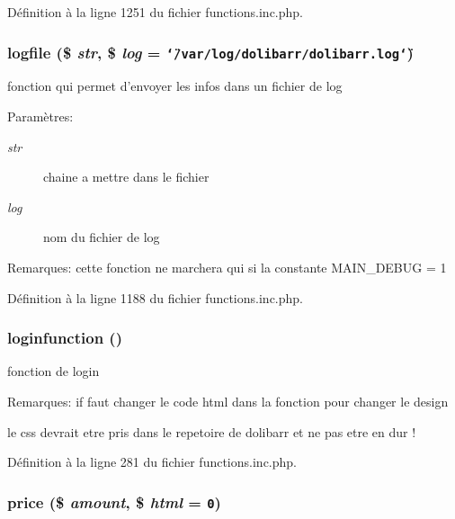 D\'{e}finition \`{a} la ligne 1251 du fichier functions.inc.php.\hypertarget{functions_8inc_8php_a44}{
\subsubsection[logfile]{\setlength{\rightskip}{0pt plus 5cm}logfile (\$ {\em str}, \$ {\em log} = {\tt \char`\"{}/var/log/dolibarr/dolibarr.log\char`\"{}})}}
\label{functions_8inc_8php_a44}


fonction qui permet d'envoyer les infos dans un fichier de log 

\begin{Desc}
\item[Param\`{e}tres:]
\begin{description}
\item[{\em str}]chaine a mettre dans le fichier \item[{\em log}]nom du fichier de log \end{description}
\end{Desc}
\begin{Desc}
\item[Remarques:]cette fonction ne marchera qui si la constante MAIN\_\-DEBUG = 1 \end{Desc}


D\'{e}finition \`{a} la ligne 1188 du fichier functions.inc.php.\hypertarget{functions_8inc_8php_a21}{
\subsubsection[loginfunction]{\setlength{\rightskip}{0pt plus 5cm}loginfunction ()}}
\label{functions_8inc_8php_a21}


fonction de login 

\begin{Desc}
\item[Remarques:]if faut changer le code html dans la fonction pour changer le design 

le css devrait etre pris dans le repetoire de dolibarr et ne pas etre en dur ! \end{Desc}


D\'{e}finition \`{a} la ligne 281 du fichier functions.inc.php.\hypertarget{functions_8inc_8php_a38}{
\subsubsection[price]{\setlength{\rightskip}{0pt plus 5cm}price (\$ {\em amount}, \$ {\em html} = {\tt 0})}}
\label{functions_8inc_8php_a38}


